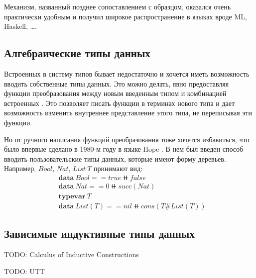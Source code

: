 Механизм, названный позднее сопоставлением с образцом, оказался очень
практически удобным и получил широкое распространение в языках
вроде ML, Haskell, \dots.

\subsection{Алгебраические типы данных}

Встроенных в систему типов бывает недостаточно и хочется иметь
возможность вводить собственные типы данных. Это можно делать, явно
предоставляя функции преобразования между новым введенным типом и
комбинацией встроенных
\cite{transformation-system-for-developing-recursive-programs}.
Это позволяет писать функции в терминах нового типа и дает возможность
изменить внутреннее представление этого типа, не переписывая эти функции.

Но от ручного написания функций преобразования тоже хочется избавиться,
что было впервые сделано в 1980-м году в языке Hope
\cite{hope-an-experimental-applicative-language}.
В нем был введен способ вводить пользовательские типы данных, которые имеют форму деревьев.
Например, \(Bool\), \(Nat\), \(List\ T\) принимают вид:
\begin{align*}
&\mathbf{data}\ Bool == true \doubleplus false\\
&\mathbf{data}\ Nat == 0 \doubleplus succ(Nat)\\
&\mathbf{typevar}\ T\\
&\mathbf{data}\ List(T) == nil \doubleplus cons(T \# List(T))
\end{align*}

\subsection{Зависимые индуктивные типы данных}

TODO: Calculus of Inductive Constructions

TODO: UTT
